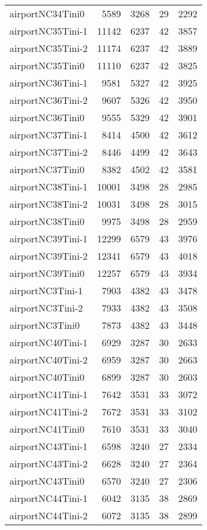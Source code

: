 \begin{longtable}{lrrrr}
airportNC34Tini0 & 5589 & 3268 & 29 & 2292 \\
airportNC35Tini-1 & 11142 & 6237 & 42 & 3857 \\
airportNC35Tini-2 & 11174 & 6237 & 42 & 3889 \\
airportNC35Tini0 & 11110 & 6237 & 42 & 3825 \\
airportNC36Tini-1 & 9581 & 5327 & 42 & 3925 \\
airportNC36Tini-2 & 9607 & 5326 & 42 & 3950 \\
airportNC36Tini0 & 9555 & 5329 & 42 & 3901 \\
airportNC37Tini-1 & 8414 & 4500 & 42 & 3612 \\
airportNC37Tini-2 & 8446 & 4499 & 42 & 3643 \\
airportNC37Tini0 & 8382 & 4502 & 42 & 3581 \\
airportNC38Tini-1 & 10001 & 3498 & 28 & 2985 \\
airportNC38Tini-2 & 10031 & 3498 & 28 & 3015 \\
airportNC38Tini0 & 9975 & 3498 & 28 & 2959 \\
airportNC39Tini-1 & 12299 & 6579 & 43 & 3976 \\
airportNC39Tini-2 & 12341 & 6579 & 43 & 4018 \\
airportNC39Tini0 & 12257 & 6579 & 43 & 3934 \\
airportNC3Tini-1 & 7903 & 4382 & 43 & 3478 \\
airportNC3Tini-2 & 7933 & 4382 & 43 & 3508 \\
airportNC3Tini0 & 7873 & 4382 & 43 & 3448 \\
airportNC40Tini-1 & 6929 & 3287 & 30 & 2633 \\
airportNC40Tini-2 & 6959 & 3287 & 30 & 2663 \\
airportNC40Tini0 & 6899 & 3287 & 30 & 2603 \\
airportNC41Tini-1 & 7642 & 3531 & 33 & 3072 \\
airportNC41Tini-2 & 7672 & 3531 & 33 & 3102 \\
airportNC41Tini0 & 7610 & 3531 & 33 & 3040 \\
airportNC43Tini-1 & 6598 & 3240 & 27 & 2334 \\
airportNC43Tini-2 & 6628 & 3240 & 27 & 2364 \\
airportNC43Tini0 & 6570 & 3240 & 27 & 2306 \\
airportNC44Tini-1 & 6042 & 3135 & 38 & 2869 \\
airportNC44Tini-2 & 6072 & 3135 & 38 & 2899 \\

\end{longtable}

